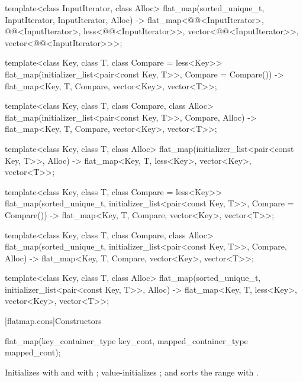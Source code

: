 \begin{codeblock}
\begin{codeblock}
\begin{codeblock}
\begin{addedblock}
\begin{codeblock}
{  template<class InputIterator, class Alloc>
    flat_map(sorted_unique_t, InputIterator, InputIterator, Alloc)
      -> flat_map<@@<InputIterator>, @@<InputIterator>,
                  less<@@<InputIterator>>,
                  vector<@@<InputIterator>>,
                  vector<@@<InputIterator>>>;

  template<class Key, class T, class Compare = less<Key>>
    flat_map(initializer_list<pair<const Key, T>>, Compare = Compare())
      -> flat_map<Key, T, Compare, vector<Key>, vector<T>>;

  template<class Key, class T, class Compare, class Alloc>
    flat_map(initializer_list<pair<const Key, T>>, Compare, Alloc)
      -> flat_map<Key, T, Compare, vector<Key>, vector<T>>;

  template<class Key, class T, class Alloc>
    flat_map(initializer_list<pair<const Key, T>>, Alloc)
      -> flat_map<Key, T, less<Key>, vector<Key>, vector<T>>;

  template<class Key, class T, class Compare = less<Key>>
  flat_map(sorted_unique_t, initializer_list<pair<const Key, T>>, Compare = Compare())
      -> flat_map<Key, T, Compare, vector<Key>, vector<T>>;

  template<class Key, class T, class Compare, class Alloc>
    flat_map(sorted_unique_t, initializer_list<pair<const Key, T>>, Compare, Alloc)
      -> flat_map<Key, T, Compare, vector<Key>, vector<T>>;

  template<class Key, class T, class Alloc>
    flat_map(sorted_unique_t, initializer_list<pair<const Key, T>>, Alloc)
      -> flat_map<Key, T, less<Key>, vector<Key>, vector<T>>;
}
\end{codeblock}

[flatmap.cons]{Constructors}

%
\begin{itemdecl}
flat_map(key_container_type key_cont, mapped_container_type mapped_cont);
\end{itemdecl}

\begin{itemdescr}
\pnum
\effects Initializes  with
 and  with
; value-initializes ; and sorts the range
 with .


\end{itemdescr}
\end{addedblock}
\end{codeblock}
\end{codeblock}
\end{codeblock}
